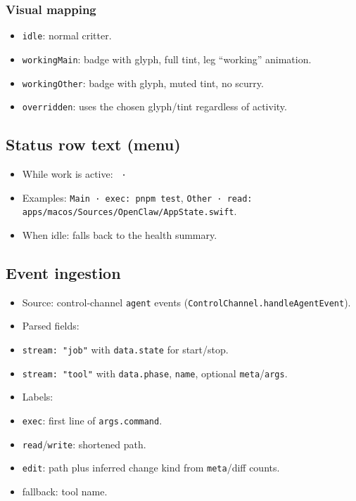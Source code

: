 \subsubsection{Visual mapping}


\begin{itemize}
  \item \texttt{idle}: normal critter.
  \item \texttt{workingMain}: badge with glyph, full tint, leg “working” animation.
  \item \texttt{workingOther}: badge with glyph, muted tint, no scurry.
  \item \texttt{overridden}: uses the chosen glyph/tint regardless of activity.
\end{itemize}


\subsection{Status row text (menu)}


\begin{itemize}
  \item While work is active: \texttt{ · }
  \item Examples: \texttt{Main · exec: pnpm test}, \texttt{Other · read: apps/macos/Sources/OpenClaw/AppState.swift}.
  \item When idle: falls back to the health summary.
\end{itemize}


\subsection{Event ingestion}


\begin{itemize}
  \item Source: control‑channel \texttt{agent} events (\texttt{ControlChannel.handleAgentEvent}).
  \item Parsed fields:
  \item \texttt{stream: "job"} with \texttt{data.state} for start/stop.
  \item \texttt{stream: "tool"} with \texttt{data.phase}, \texttt{name}, optional \texttt{meta}/\texttt{args}.
  \item Labels:
  \item \texttt{exec}: first line of \texttt{args.command}.
  \item \texttt{read}/\texttt{write}: shortened path.
  \item \texttt{edit}: path plus inferred change kind from \texttt{meta}/diff counts.
  \item fallback: tool name.
\end{itemize}


